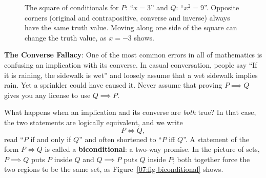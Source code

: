 \begin{figure}[htbp]
\caption{The square of conditionals for $P$: ``$x = 3$'' and $Q$: ``$x^2 = 9$''. Opposite corners (original and contrapositive, converse and inverse) always have the same truth value. Moving along one side of the square can change the truth value, as $x = -3$ shows.}
\label{07:fig-square-of-conditionals}
\end{figure}

\begin{trapbox}
\textbf{The Converse Fallacy}: One of the most common errors in all of mathematics is confusing an implication with its converse. In casual conversation, people say ``If it is raining, the sidewalk is wet'' and loosely assume that a wet sidewalk implies rain. Yet a sprinkler could have caused it. Never assume that proving $P \implies Q$ gives you any license to use $Q \implies P$.
\end{trapbox}

What happens when an implication and its converse are \emph{both} true? In that case, the two statements are logically equivalent, and we write
\[
P \iff Q,
\]
read ``$P$ if and only if $Q$'' and often shortened to ``$P$ iff $Q$''. A statement of the form $P \iff Q$ is called a \textbf{biconditional}: a two-way promise. In the picture of sets, $P \implies Q$ puts $P$ inside $Q$ and $Q \implies P$ puts $Q$ inside $P$; both together force the two regions to be the same set, as Figure~\ref{07:fig-biconditional} shows.

